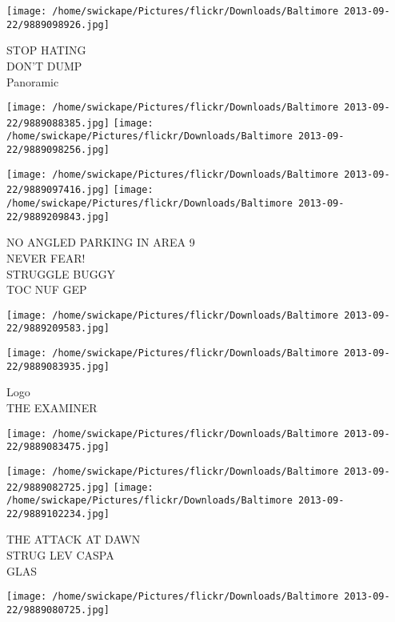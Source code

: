 \documentclass[10pt,letterpaper]{article}
\begin{document}
\vspace{0.25in}
\texttt{[image: /home/swickape/Pictures/flickr/Downloads/Baltimore 2013-09-22/9889098926.jpg]}

STOP HATING\\
DON'T DUMP\\
Panoramic\\
\pagebreak

\texttt{[image: /home/swickape/Pictures/flickr/Downloads/Baltimore 2013-09-22/9889088385.jpg]}
\texttt{[image: /home/swickape/Pictures/flickr/Downloads/Baltimore 2013-09-22/9889098256.jpg]}

\texttt{[image: /home/swickape/Pictures/flickr/Downloads/Baltimore 2013-09-22/9889097416.jpg]}
\texttt{[image: /home/swickape/Pictures/flickr/Downloads/Baltimore 2013-09-22/9889209843.jpg]}

NO ANGLED PARKING IN AREA 9\\
NEVER FEAR!\\
STRUGGLE BUGGY\\
TOC NUF GEP\\
\pagebreak

\texttt{[image: /home/swickape/Pictures/flickr/Downloads/Baltimore 2013-09-22/9889209583.jpg]}

\vspace{0.25in}
\texttt{[image: /home/swickape/Pictures/flickr/Downloads/Baltimore 2013-09-22/9889083935.jpg]}

Logo\\
THE EXAMINER\\
\pagebreak

\texttt{[image: /home/swickape/Pictures/flickr/Downloads/Baltimore 2013-09-22/9889083475.jpg]}

\vspace{0.25in}
\texttt{[image: /home/swickape/Pictures/flickr/Downloads/Baltimore 2013-09-22/9889082725.jpg]}
\texttt{[image: /home/swickape/Pictures/flickr/Downloads/Baltimore 2013-09-22/9889102234.jpg]}

THE ATTACK AT DAWN\\
STRUG LEV CASPA\\
GLAS\\
\pagebreak

\texttt{[image: /home/swickape/Pictures/flickr/Downloads/Baltimore 2013-09-22/9889080725.jpg]}
\end{document}
